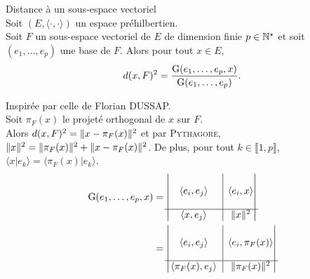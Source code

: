\begin{prop}
    Distance à un sous-espace vectoriel \\
    Soit $(E, \langle \cdot , \cdot \rangle)$ un espace préhilbertien. \\
    Soit $F$ un sous-espace vectoriel de $E$ de dimension finie $p \in \mathbb{N}^\star$ et soit $(e_1, \dots, e_p)$ une base de $F$. Alors pour tout $x \in E$,
    $$d(x, F)^2 = \frac{\mathrm{G}(e_1, \dots, e_p, x)}{\mathrm{G}(e_1, \dots, e_p)}.$$
\end{prop}

\begin{preuve}
    Inspirée par celle de Florian DUSSAP. \\
    Soit $\pi_F(x)$ le projeté orthogonal de $x$ sur $F$. \\
    Alors $d(x, F)^2 = \Vert x - \pi_F(x) \Vert^2$ et par \textsc{Pythagore}, $\Vert x \Vert^2 = \Vert \pi_F(x) \Vert^2 + \Vert x - \pi_F(x) \Vert^2$. De plus, pour tout $k \in \llbracket 1, p \rrbracket$, $\langle x | e_k \rangle = \langle \pi_F(x) | e_k \rangle$.
    \begin{align*}
        \Gram(e_1, \dots, e_p, x) &= 
        \begin{vmatrix}
          \begin{matrix}
            & & \\
            & \langle e_i, e_j \rangle & \\
            & &
          \end{matrix}
          & \rvline & \langle e_i, x \rangle \\
        \hline
          \langle x, e_j \rangle & \rvline &
          \begin{matrix}
          \norme{x}^2
          \end{matrix}
        \end{vmatrix} \\
        & = \begin{vmatrix}
          \begin{matrix}
            & & \\
            & \langle e_i, e_j \rangle & \\
            & &
          \end{matrix}
          & \rvline & \langle e_i, \pi_F(x) \rangle \\
        \hline
          \langle \pi_F(x), e_j \rangle & \rvline &
          \begin{matrix}
          \norme{\pi_F(x)}^2
          \end{matrix}
        \end{vmatrix}

\end{align*}
\end{preuve}
